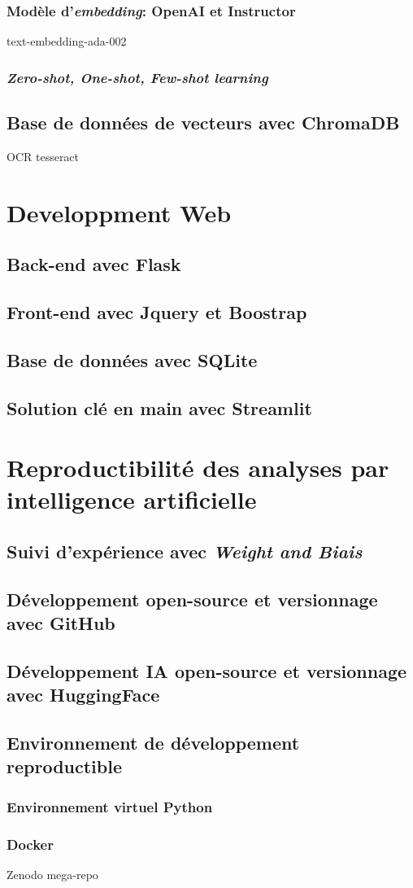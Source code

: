\subsubsection{Modèle d'\textit{embedding}: OpenAI et Instructor}
text-embedding-ada-002
\subsubsection{\textit{Zero-shot, One-shot, Few-shot learning}}
\subsection{Base de données de vecteurs avec ChromaDB}
OCR tesseract

\section{Developpment Web}
\subsection{Back-end avec Flask}
\subsection{Front-end avec Jquery et Boostrap}
\subsection{Base de données avec SQLite}
\subsection{Solution clé en main avec Streamlit}

\section{Reproductibilité des analyses par intelligence artificielle}
\subsection{Suivi d'expérience avec \textit{Weight and Biais}}
\subsection{Développement open-source et versionnage avec GitHub}
\subsection{Développement IA open-source et versionnage avec HuggingFace}
\subsection{Environnement de développement reproductible}
\subsubsection{Environnement virtuel Python}
\subsubsection{Docker}
Zenodo mega-repo